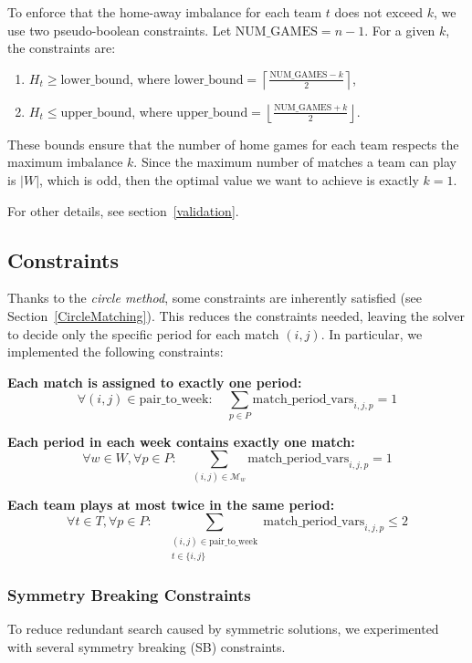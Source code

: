 To enforce that the home-away imbalance for each team $t$ does not exceed $k$, we use two pseudo-boolean constraints. Let $\text{NUM\_GAMES} = n-1$. For a given $k$, the constraints are:
\begin{enumerate}
    \item $H_t \ge \text{lower\_bound}$, where $\text{lower\_bound} = \left\lceil \frac{\text{NUM\_GAMES} - k}{2} \right\rceil$,
    \item $H_t \le \text{upper\_bound}$, where $\text{upper\_bound} = \left\lfloor \frac{\text{NUM\_GAMES} + k}{2} \right\rfloor$.
\end{enumerate}
These bounds ensure that the number of home games for each team respects the maximum imbalance $k$. Since the maximum number of matches a team can play is $|W|$, which is odd, then the optimal value we want to achieve is exactly $k=1$.

For other details, see section~\ref{validation}.


\subsection{Constraints}
Thanks to the \emph{circle method}, some constraints are inherently satisfied (see Section~\ref{CircleMatching}).
This reduces the constraints needed, leaving the solver to decide only the specific period for each match $(i,j)$. In particular, we implemented the following constraints:

\textbf{Each match is assigned to exactly one period:}
\[
\forall (i,j) \in \text{pair\_to\_week}: \quad \sum_{p \in P} \text{match\_period\_vars}_{i,j,p} = 1
\]

\textbf{Each period in each week contains exactly one match:}
\[
\forall w \in W, \forall p \in P: \quad \sum_{(i,j) \in \mathcal{M}_w} \text{match\_period\_vars}_{i,j,p} = 1
\]

\textbf{Each team plays at most twice in the same period:}
\[
\forall t \in T, \forall p \in P: \quad \sum_{\substack{(i,j) \in \text{pair\_to\_week} \\ t \in \{i,j\}}} \text{match\_period\_vars}_{i,j,p} \leq 2
\]

\subsubsection*{Symmetry Breaking Constraints}
To reduce redundant search caused by symmetric solutions, we experimented with several symmetry breaking (SB) constraints.

